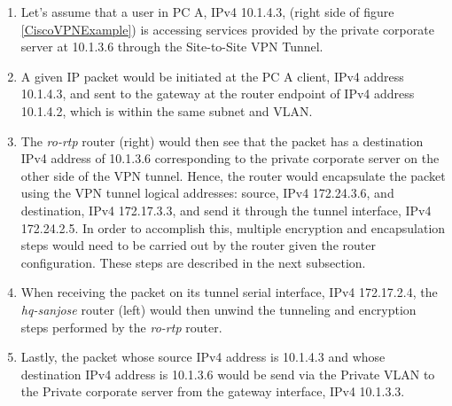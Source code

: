\documentclass[12pt,letterpaper]{report}
\begin{document}
\begin{enumerate}
	\item%
	{Let's assume that a user in PC A, IPv4 10.1.4.3, (right side of figure {\ref{CiscoVPNExample}}) is accessing services provided by the private corporate server at 10.1.3.6 through the Site-to-Site VPN Tunnel.}
	\item%
	{A given IP packet would be initiated at the PC A client, IPv4 address 10.1.4.3, and sent to the gateway at the router endpoint of IPv4 address 10.1.4.2, which is within the same subnet and VLAN.}
	\item%
	{The \textit{ro-rtp} router (right) would then see that the packet has a destination IPv4 address of 10.1.3.6 corresponding to the private corporate server on the other side of the VPN tunnel. Hence, the router would encapsulate the packet using the VPN tunnel logical addresses: source, IPv4 172.24.3.6, and destination, IPv4 172.17.3.3, and send it through the tunnel interface, IPv4 172.24.2.5. In order to accomplish this, multiple encryption and encapsulation steps would need to be carried out by the router given the router configuration. These steps are described in the next subsection.}
	\item%
	{When receiving the packet on its tunnel serial interface, IPv4 172.17.2.4, the \textit{hq-sanjose} router (left) would then unwind the tunneling and encryption steps performed by the \textit{ro-rtp} router.}
	\item%
	{Lastly, the packet whose source IPv4 address is 10.1.4.3 and whose destination IPv4 address is 10.1.3.6 would be send via the Private VLAN to the Private corporate server from the gateway interface, IPv4 10.1.3.3.}
\end{enumerate}


\end{document}
